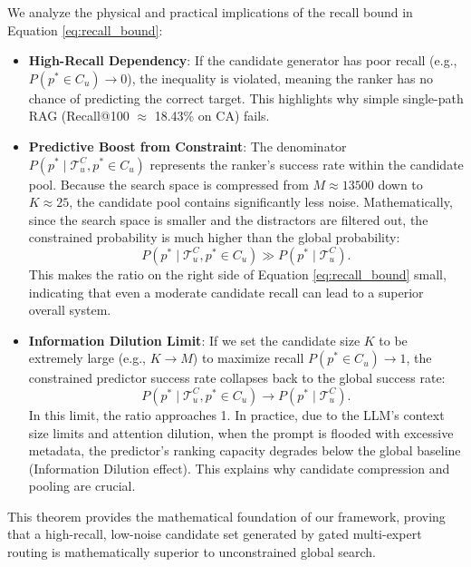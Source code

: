 \documentclass[10pt,twocolumn]{article}
\begin{document}
We analyze the physical and practical implications of the recall bound in Equation \eqref{eq:recall_bound}:
\begin{itemize}
    \item \textbf{High-Recall Dependency}: If the candidate generator has poor recall (e.g., $P(p^* \in C_u) \rightarrow 0$), the inequality is violated, meaning the ranker has no chance of predicting the correct target. This highlights why simple single-path RAG (Recall@100 $\approx$ 18.43\% on CA) fails.
    \item \textbf{Predictive Boost from Constraint}: The denominator $P(p^* \mid \mathcal{T}^C_u, p^* \in C_u)$ represents the ranker's success rate within the candidate pool. Because the search space is compressed from $M \approx 13500$ down to $K \approx 25$, the candidate pool contains significantly less noise. Mathematically, since the search space is smaller and the distractors are filtered out, the constrained probability is much higher than the global probability:
    \begin{equation}
        P(p^* \mid \mathcal{T}^C_u, p^* \in C_u) \gg P(p^* \mid \mathcal{T}^C_u).
    \end{equation}
    This makes the ratio on the right side of Equation \eqref{eq:recall_bound} small, indicating that even a moderate candidate recall can lead to a superior overall system.
    \item \textbf{Information Dilution Limit}: If we set the candidate size $K$ to be extremely large (e.g., $K \rightarrow M$) to maximize recall $P(p^* \in C_u) \rightarrow 1$, the constrained predictor success rate collapses back to the global success rate:
    \begin{equation}
        P(p^* \mid \mathcal{T}^C_u, p^* \in C_u) \rightarrow P(p^* \mid \mathcal{T}^C_u).
    \end{equation}
    In this limit, the ratio approaches 1. In practice, due to the LLM's context size limits and attention dilution, when the prompt is flooded with excessive metadata, the predictor's ranking capacity degrades below the global baseline (Information Dilution effect). This explains why candidate compression and pooling are crucial.
\end{itemize}

This theorem provides the mathematical foundation of our framework, proving that a high-recall, low-noise candidate set generated by gated multi-expert routing is mathematically superior to unconstrained global search.
\end{document}
